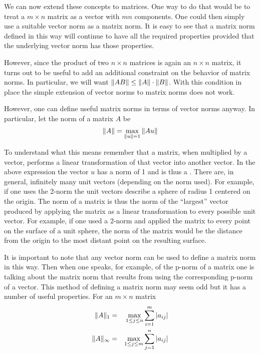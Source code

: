 We can now extend these concepts to matrices. One way to do that would be to treat a $m \times
n$ matrix as a vector with $mn$ components. One could then simply use a suitable vector norm as
a matrix norm. It is easy to see that a matrix norm defined in this way will continue to have
all the required properties provided that the underlying vector norm has those properties.

However, since the product of two $n \times n$ matrices is again an $n \times n$ matrix, it
turns out to be useful to add an additional constraint on the behavior of matrix norms. In
particular, we will want $\|AB\| \le \|A\| \cdot \|B\|$. With this condition in place
the simple extension of vector norms to matrix norms does not work.

However, one can define useful matrix norms in terms of vector norms anyway. In particular, let
the norm of a matrix $A$ be
\begin{displaymath}
\|A\| = \max_{\|u\| = 1} \|Au\|
\end{displaymath}

To understand what this means remember that a matrix, when multiplied by a vector, performs a
linear transformation of that vector into another vector. In the above expression the vector $u$
has a norm of 1 and is thus a . There are, in general, infinitely many unit
vectors (depending on the norm used). For example, if one uses the 2-norm the unit vectors
describe a sphere of radius 1 centered on the origin. The norm of a matrix is thus the norm of
the ``largest'' vector produced by applying the matrix as a linear transformation to every
possible unit vector. For example, if one used a 2-norm and applied the matrix to every point on
the surface of a unit sphere, the norm of the matrix would be the distance from the origin to
the most distant point on the resulting surface.

It is important to note that any vector norm can be used to define a matrix norm in this way.
Then when one speaks, for example, of the p-norm of a matrix one is talking about the matrix
norm that results from using the corresponding p-norm of a vector. This method of defining a
matrix norm may seem odd but it has a number of useful properties. For an $m \times n$ matrix
\begin{eqnarray*}
\|A\|_1 & = & \max_{1 \le j \le n} \sum_{i = 1}^m |a_{ij}| \\
\|A\|_\infty & = & \max_{1 \le j \le m} \sum_{j = 1}^n |a_{ij}|
\end{eqnarray*}

